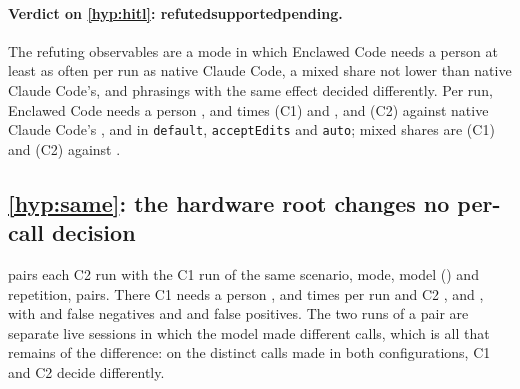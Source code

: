 \documentclass[11pt]{article}
\newcommand{\cz}{Enclawed Code}
\newcommand{\czVerdict}[1]{\textbf{\ifcase#1 refuted\or supported\or pending\fi}}
\newcommand{\VerdictHthree}{\czVerdict{\HthreeCode}}
\begin{document}
\paragraph{Verdict on \ref{hyp:hitl}: \VerdictHthree{}.} The refuting
observables are a mode in which \cz{} needs a person at least as often
per run as native Claude Code, a mixed share not lower than native
Claude Code's, and phrasings with the same effect decided differently.
Per run, \cz{} needs a person \CzOneDefaultNeedPerRun{},
\CzOneAcceptEditsNeedPerRun{} and \CzOneAutoNeedPerRun{} times (C1) and
\CzTwoDefaultNeedPerRun{}, \CzTwoAcceptEditsNeedPerRun{} and
\CzTwoAutoNeedPerRun{} (C2) against native Claude Code's
\NativeDefaultNeedPerRun{}, \NativeAcceptEditsNeedPerRun{} and
\NativeAutoNeedPerRun{} in \texttt{default}, \texttt{acceptEdits} and
\texttt{auto}; mixed shares are \SameCzOneMixedShare{} (C1) and
\SameCzTwoMixedShare{} (C2) against \SameNativeMixedShare{}.

\subsection{\ref{hyp:same}: the hardware root changes no per-call decision}
\label{sec:res-h4}

 pairs each C2 run with the C1 run of the same
scenario, mode, model (\MatchedModels{}) and repetition, \MatchedRuns{}
pairs. There C1 needs a person \MatchedCzOneDefaultNeedPerRun{},
\MatchedCzOneAcceptEditsNeedPerRun{} and \MatchedCzOneAutoNeedPerRun{}
times per run and C2 \MatchedCzTwoDefaultNeedPerRun{},
\MatchedCzTwoAcceptEditsNeedPerRun{} and \MatchedCzTwoAutoNeedPerRun{},
with \MatchedCzOneFN{} and \MatchedCzTwoFN{} false negatives and
\MatchedCzOneFP{} and \MatchedCzTwoFP{} false positives. The two runs of a
pair are separate live sessions in which the model made different calls,
which is all that remains of the difference: on the \SharedCalls{}
distinct calls made in both configurations, C1 and C2 decide
\SharedCallsDiffer{} differently.

\begin{table}[!htbp]
\centering\footnotesize
\caption{C1 and C2 on matched runs (same scenario, mode, model
\MatchedModels{} and repetition), each run's live calls decided by the
current release. ``Need a person'': \texttt{ask} decisions; $^\dagger$in
\texttt{bypassPermissions} \cz{} asks no one. FN and FP as in
\cref{sec:catalog}.}
\label{tab:matched}

\end{table}
\end{document}
